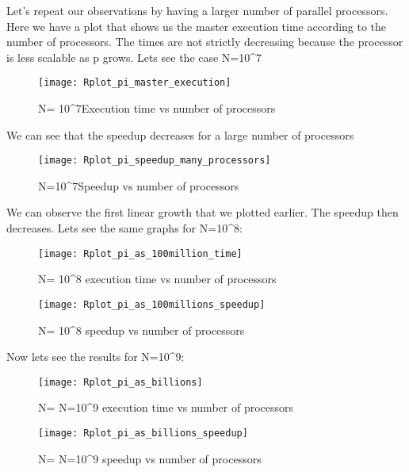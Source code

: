 \documentclass[11pt]{scrartcl} %
\begin{document}
Let's repeat our observations by having a larger number of parallel processors.
Here we have a plot that shows us the master execution time according to the number of processors. The times are not strictly decreasing because the processor is less scalable as p grows. Lets see the case N=10^7
\begin{figure}[H] %
	\centering
	\texttt{[image: Rplot\_pi\_master\_execution]} %
	\caption{N= 10^7Execution time vs number of processors}
\end{figure}
We can see that the speedup  decreases for a large number of processors
\begin{figure}[H] %
	\centering
	\texttt{[image: Rplot\_pi\_speedup\_many\_processors]} %
	\caption{N=10^7Speedup vs number of processors}
\end{figure}
We can observe the first linear growth that we plotted earlier. The speedup then decreases.
Lets see the same graphs for N=10^8:
\begin{figure}[H] %
	\centering
	\texttt{[image: Rplot\_pi\_as\_100million\_time]} %
	\caption{N= 10^8 execution time vs number of processors}
\end{figure}
\begin{figure}[H] %
	\centering
	\texttt{[image: Rplot\_pi\_as\_100millions\_speedup]} %
	\caption{N= 10^8 speedup vs number of processors}
\end{figure}
Now lets see the results for N=10^9:
\begin{figure}[H] %
	\centering
	\texttt{[image: Rplot\_pi\_as\_billions]} %
	\caption{N= N=10^9 execution time vs number of processors}
\end{figure}
\begin{figure}[H] %
	\centering
	\texttt{[image: Rplot\_pi\_as\_billions\_speedup]} %
	\caption{N= N=10^9 speedup vs number of processors}
\end{figure}
\end{document}

